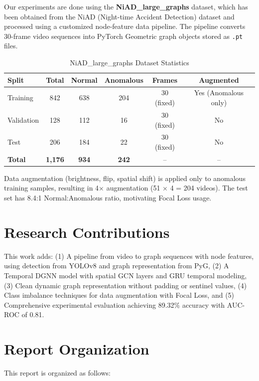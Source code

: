 Our experiments are done using the \textbf{NiAD\_large\_graphs} dataset, which has been obtained from the NiAD (Night-time Accident Detection) dataset and processed using a customized node-feature data pipeline. The pipeline converts 30-frame video sequences into PyTorch Geometric graph objects stored as \texttt{.pt} files.

\begin{table}[H]
\centering
\caption{NiAD\_large\_graphs Dataset Statistics}
\label{tab:dataset_stats}
\begin{tabular}{lccccc}
\toprule
\textbf{Split} & \textbf{Total} & \textbf{Normal} & \textbf{Anomalous} & \textbf{Frames} & \textbf{Augmented} \\
\midrule
Training & 842 & 638 & 204 & 30 (fixed) & Yes (Anomalous only) \\
Validation & 128 & 112 & 16 & 30 (fixed) & No \\
Test & 206 & 184 & 22 & 30 (fixed) & No \\
\midrule
\textbf{Total} & \textbf{1,176} & \textbf{934} & \textbf{242} & -- & -- \\
\bottomrule
\end{tabular}
\end{table}

Data augmentation (brightness, flip, spatial shift) is applied only to anomalous training samples, resulting in 4$\times$ augmentation (51 $\times$ 4 = 204 videos). The test set has 8.4:1 Normal:Anomalous ratio, motivating Focal Loss usage.

\section{Research Contributions}

This work adds: (1) A pipeline from video to graph sequences with node features, using detection from YOLOv8 and graph representation from PyG, (2) A Temporal DGNN model with spatial GCN layers and GRU temporal modeling, (3) Clean dynamic graph representation without padding or sentinel values, (4) Class imbalance techniques for data augmentation with Focal Loss, and (5) Comprehensive experimental evaluation achieving 89.32\% accuracy with AUC-ROC of 0.81.

\section{Report Organization}

This report is organized as follows:

